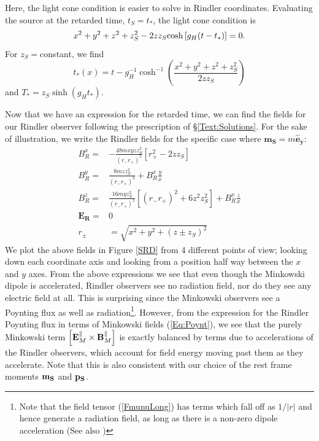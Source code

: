 Here, the light cone condition is easier to solve in Rindler coordinates.
Evaluating the source at the retarded time, $t_S=t_*$, the light cone condition is
\begin{equation}
x^2 +y^2 + z^2 + z^2_S -2z z_S \hbox{cosh}\left[g_H(t-t_*)\right] = 0.
\label{Eq:nullrepeat}
\end{equation}
For $z_S=$constant, we find
\begin{equation}
t_*(x) =t - g_H^{-1}\cosh^{-1}\left ( \frac{x^2 +y^2 + z^2 + z^2_S
}{2z z_S }\right )
\label{Eq:nullrepeat}
\end{equation}
and $T_*=z_S \sinh(g_H t_*)$.


Now that we have an expression for the retarded time, we can find the
fields for our Rindler observer following the prescription of \S \ref{Text:Solutions}.
For the sake of illustration, we write the Rindler fields for the
specific case where $\mathbf{m_S} = m \mathbf{\hat{e}_y}$:
\begin{align}
B_R^x =& -\frac{48 m x y z z^2_S}{ \left(r_- r_+ \right)^5 } \left[ r^2_+ - 2z z_S  \right]  \nonumber \\
B_R^y =& \frac{8 m z z^2_S}{\left(r_- r_+\right)^3} + B_R^x \frac{y}{x}
 \nonumber \\
B_R^z =&  \frac{16 m y z^2_S}{\left(r_- r_+\right)^5} \left[ (r_- r_+)^2 + 6 z^2z^2_S\right] + B_R^x \frac{z}{x} \nonumber \\
\mathbf{E_R} =& 0 \\
r_{\pm} &= \sqrt{x^2 + y^2 + (z \pm z_S )^2} \nonumber
\end{align}
We plot the above fields in Figure \ref{SRD} from 4 different
points of view; looking down each coordinate axis and looking
from a position half way between the $x$ and $y$ axes. From the above
expressions we see that even though the Minkowski dipole is
accelerated, Rindler
observers see no radiation field, nor do they see any electric field
at all. This is surprising since the Minkowski observers see a Poynting flux as well as radiation\footnote{Note that the field tensor (\ref{FmunuLong}) has terms which fall off as $1/|r|$ and hence generate a radiation field, as long as there is a non-zero dipole acceleration (See also \citep{Heras:1998})}. However, from the expression for the Rindler Poynting flux in terms of Minkowski fields (\ref{Eq:Poynt}), we see that the purely Minkowski term $\left [{\bf E}_M^\parallel \times {\bf B}_M^\parallel\right ]$ is exactly balanced by terms due to accelerations of the Rindler observers, which account for field energy moving past them as they accelerate. Note that this is also consistent with our choice of the rest frame moments ${\bf{m_S}}$ and ${\bf{p_S}}$.

